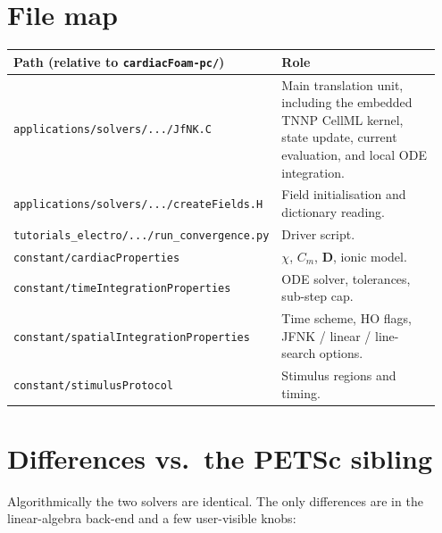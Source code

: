 \documentclass[11pt,a4paper]{article}
\newcommand{\Dten}{\mathbf{D}}
\newcommand{\code}[1]{\texttt{\small #1}}
\begin{document}
\section{File map}

\begin{center}
\begin{tabular}{@{}p{0.55\linewidth}p{0.40\linewidth}@{}}
\toprule
Path (relative to \code{cardiacFoam-pc/}) & Role \\
\midrule
\code{applications/solvers/.../JfNK.C} & Main translation unit, including
   the embedded TNNP CellML kernel, state update, current evaluation, and
   local ODE integration. \\
\code{applications/solvers/.../createFields.H} & Field initialisation
   and dictionary reading. \\
\code{tutorials\_electro/.../run\_convergence.py} & Driver script. \\
\code{constant/cardiacProperties} & $\chi$, $C_{m}$, $\Dten$,
   ionic model. \\
\code{constant/timeIntegrationProperties} & ODE solver, tolerances,
   sub-step cap. \\
\code{constant/spatialIntegrationProperties} & Time scheme, HO flags,
   JFNK / linear / line-search options. \\
\code{constant/stimulusProtocol} & Stimulus regions and timing. \\
\bottomrule
\end{tabular}
\end{center}

\section{Differences vs.\ the PETSc sibling}

Algorithmically the two solvers are identical. The only differences
are in the linear-algebra back-end and a few user-visible knobs:
\end{document}
